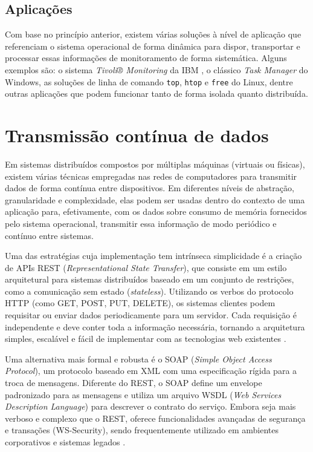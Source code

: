 \subsection{Aplicações}

Com base no princípio anterior, existem várias soluções à nível de aplicação que referenciam o sistema operacional de forma dinâmica para dispor, transportar e processar essas informações de monitoramento de forma sistemática. Alguns exemplos são: o sistema \textit{Tivoli® Monitoring} da IBM \cite{boss2007cloud}, o clássico \textit{Task Manager} do Windows, as soluções de linha de comando \texttt{top}, \texttt{htop} e \texttt{free} do Linux, dentre outras aplicações que podem funcionar tanto de forma isolada quanto distribuída.
 
\section{Transmissão contínua de dados}

Em sistemas distribuídos compostos por múltiplas máquinas (virtuais ou físicas), existem várias técnicas empregadas nas redes de computadores para transmitir dados de forma contínua entre dispositivos. Em diferentes níveis de abstração, granularidade e complexidade, elas podem ser usadas dentro do contexto de uma aplicação para, efetivamente, com os dados sobre consumo de memória fornecidos pelo sistema operacional, transmitir essa informação de modo periódico e contínuo entre sistemas.

Uma das estratégias cuja implementação tem intrínseca simplicidade é a criação de APIs REST (\textit{Representational State Transfer}), que consiste em um estilo arquitetural para sistemas distribuídos baseado em um conjunto de restrições, como a comunicação sem estado (\textit{stateless}). Utilizando os verbos do protocolo HTTP (como GET, POST, PUT, DELETE), os sistemas clientes podem requisitar ou enviar dados periodicamente para um servidor. Cada requisição é independente e deve conter toda a informação necessária, tornando a arquitetura simples, escalável e fácil de implementar com as tecnologias web existentes \cite{rest_api_guide}.

Uma alternativa mais formal e robusta é o SOAP (\textit{Simple Object Access Protocol}), um protocolo baseado em XML com uma especificação rígida para a troca de mensagens. Diferente do REST, o SOAP define um envelope padronizado para as mensagens e utiliza um arquivo WSDL (\textit{Web Services Description Language}) para descrever o contrato do serviço. Embora seja mais verboso e complexo que o REST, oferece funcionalidades avançadas de segurança e transações (WS-Security), sendo frequentemente utilizado em ambientes corporativos e sistemas legados \cite{soap_spec}.

